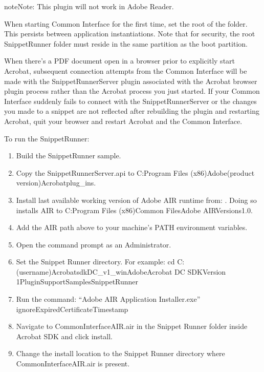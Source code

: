 \documentclass[letterpaper,12pt,english,openany,oneside]{sphinxmanual}
\begin{document}
\begin{sphinxadmonition}{note}{Note:}
This plugin will not work in Adobe Reader.
\end{sphinxadmonition}

When starting Common Interface for the first time, set the root of the  folder. This persists between application instantiations. Note that for security, the root SnippetRunner folder must reside in the same partition as the boot partition.

When there’s a PDF document open in a browser prior to explicitly start Acrobat, subsequent connection attempts from the Common Interface will be made with the SnippetRunnerServer plugin associated with the Acrobat browser plugin process rather than the Acrobat process you just started. If your Common Interface suddenly fails to connect with the SnippetRunnerServer or the changes you made to a snippet are not reflected after rebuilding the plugin and restarting Acrobat, quit your browser and restart Acrobat and the Common Interface.

To run the SnippetRunner:
\begin{enumerate}
%
\item {} 
Build the SnippetRunner sample.

\item {} 
Copy the SnippetRunnerServer.api to C:Program Files (x86)Adobe(product version)Acrobatplug\_ins.

\item {} 
Install last available working version of Adobe AIR runtime from: . Doing so installs AIR to C:Program Files (x86)Common FilesAdobe AIRVersions1.0.

\item {} 
Add the AIR path above to your machine’s PATH environment variables.

\item {} 
Open the command prompt as an Administrator.

\item {} 
Set the Snippet Runner directory. For example: cd C:(username)AcrobatsdkDC\_v1\_winAdobeAcrobat DC SDKVersion 1PluginSupportSamplesSnippetRunner

\item {} 
Run the command: “Adobe AIR Application Installer.exe” \sphinxhyphen{}ignoreExpiredCertificateTimestamp

\item {} 
Navigate to CommonInterfaceAIR.air in the Snippet Runner folder inside Acrobat SDK and click install.

\item {} 
Change the install location to the Snippet Runner directory where CommonInterfaceAIR.air is present.

\end{enumerate}
\end{document}
